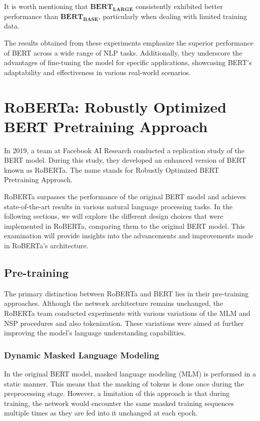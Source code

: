 \documentclass[a4paper,12pt]{report} %
\begin{document}
It is worth mentioning that $\mathbf{BERT_{LARGE}}$ consistently exhibited better performance than $\mathbf{BERT_{BASE}}$, particularly when dealing with limited training data.

The results obtained from these experiments emphasize the superior performance of BERT across a wide range of NLP tasks. Additionally, they underscore the advantages of fine-tuning the model for specific applications, showcasing BERT's adaptability and effectiveness in various real-world scenarios.

\section{RoBERTa: Robustly Optimized BERT Pretraining Approach}
In 2019, a team at Facebook AI Research conducted a replication study of the BERT model. During this study, they developed an enhanced version of BERT known as RoBERTa. The name stands for Robustly Optimized BERT Pretraining Approach.

RoBERTa surpasses the performance of the original BERT model and achieves state-of-the-art results in various natural language processing tasks. In the following sections, we will explore the different design choices that were implemented in RoBERTa, comparing them to the original BERT model. This examination will provide insights into the advancements and improvements made in RoBERTa's architecture.

\subsection{Pre-training}
The primary distinction between RoBERTa and BERT lies in their pre-training approaches. Although the network architecture remains unchanged, the RoBERTa team conducted experiments with various variations of the MLM and NSP procedures and also tokenization. These variations were aimed at further improving the model's language understanding capabilities.

\subsubsection{Dynamic Masked Language Modeling}
In the original BERT model, masked language modeling (MLM) is performed in a static manner. This means that the masking of tokens is done once during the preprocessing stage. However, a limitation of this approach is that during training, the network would encounter the same masked training sequences multiple times as they are fed into it unchanged at each epoch.
\end{document}

